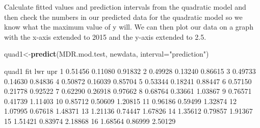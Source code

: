 \documentclass[
]{book}
\newenvironment{Shaded}{\begin{snugshade}}{\end{snugshade}}
\newcommand{\DataTypeTok}[1]{\textcolor[rgb]{0.13,0.29,0.53}{#1}}
\newcommand{\DecValTok}[1]{\textcolor[rgb]{0.00,0.00,0.81}{#1}}
\newcommand{\FloatTok}[1]{\textcolor[rgb]{0.00,0.00,0.81}{#1}}
\newcommand{\KeywordTok}[1]{\textcolor[rgb]{0.13,0.29,0.53}{\textbf{#1}}}
\newcommand{\NormalTok}[1]{#1}
\newcommand{\OperatorTok}[1]{\textcolor[rgb]{0.81,0.36,0.00}{\textbf{#1}}}
\newcommand{\StringTok}[1]{\textcolor[rgb]{0.31,0.60,0.02}{#1}}
\begin{document}
Calculate fitted values and prediction intervals from the quadratic model and then check the numbers in our predicted data for the quadratic model so we know what the maximum value of y will. We can then plot our data on a graph with the x-axis extended to 2015 and the y-axis extended to 2.5.

\begin{Shaded}
\begin{Highlighting}[]
\NormalTok{quad1<-}\KeywordTok{predict}\NormalTok{(MDR.mod.test, newdata, }\DataTypeTok{interval=}\StringTok{"prediction"}\NormalTok{)}

\NormalTok{quad1}
\NormalTok{       fit     lwr     upr}
\DecValTok{1}  \FloatTok{0.51456} \FloatTok{0.11080} \FloatTok{0.91832}
\DecValTok{2}  \FloatTok{0.49928} \FloatTok{0.13240} \FloatTok{0.86615}
\DecValTok{3}  \FloatTok{0.49733} \FloatTok{0.14630} \FloatTok{0.84836}
\DecValTok{4}  \FloatTok{0.50872} \FloatTok{0.16039} \FloatTok{0.85704}
\DecValTok{5}  \FloatTok{0.53344} \FloatTok{0.18241} \FloatTok{0.88447}
\DecValTok{6}  \FloatTok{0.57150} \FloatTok{0.21778} \FloatTok{0.92522}
\DecValTok{7}  \FloatTok{0.62290} \FloatTok{0.26918} \FloatTok{0.97662}
\DecValTok{8}  \FloatTok{0.68764} \FloatTok{0.33661} \FloatTok{1.03867}
\DecValTok{9}  \FloatTok{0.76571} \FloatTok{0.41739} \FloatTok{1.11403}
\DecValTok{10} \FloatTok{0.85712} \FloatTok{0.50609} \FloatTok{1.20815}
\DecValTok{11} \FloatTok{0.96186} \FloatTok{0.59499} \FloatTok{1.32874}
\DecValTok{12} \FloatTok{1.07995} \FloatTok{0.67618} \FloatTok{1.48371}
\DecValTok{13} \FloatTok{1.21136} \FloatTok{0.74447} \FloatTok{1.67826}
\DecValTok{14} \FloatTok{1.35612} \FloatTok{0.79857} \FloatTok{1.91367}
\DecValTok{15} \FloatTok{1.51421} \FloatTok{0.83974} \FloatTok{2.18868}
\DecValTok{16} \FloatTok{1.68564} \FloatTok{0.86999} \FloatTok{2.50129}
\end{Highlighting}
\end{Shaded}

\begin{Shaded}
\end{Shaded}
\end{document}
